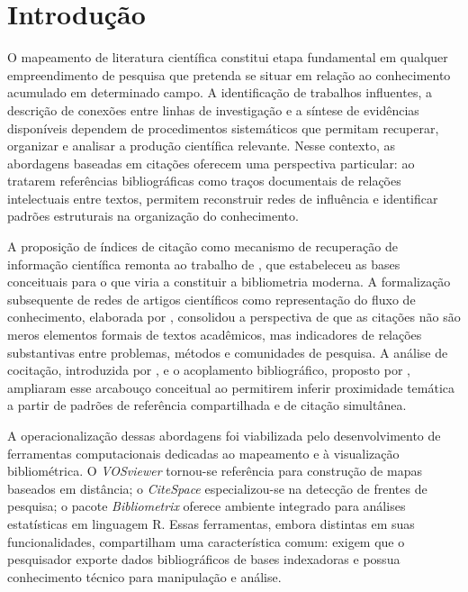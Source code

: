 \documentclass[portuguese]{textolivre}
\begin{document}
\begin{polyabstract}
\begin{english}
\begin{abstract}
\end{abstract}
\end{english}
\end{polyabstract}

\section{Introdução}\label{sec-intro}
O mapeamento de literatura científica constitui etapa fundamental em qualquer empreendimento de pesquisa que pretenda se situar em relação ao conhecimento acumulado em determinado campo. A identificação de trabalhos influentes, a descrição de conexões entre linhas de investigação e a síntese de evidências disponíveis dependem de procedimentos sistemáticos que permitam recuperar, organizar e analisar a produção científica relevante. Nesse contexto, as abordagens baseadas em citações oferecem uma perspectiva particular: ao tratarem referências bibliográficas como traços documentais de relações intelectuais entre textos, permitem reconstruir redes de influência e identificar padrões estruturais na organização do conhecimento.

	A proposição de índices de citação como mecanismo de recuperação de informação científica remonta ao trabalho de \textcite{Garfield1955}, que estabeleceu as bases conceituais para o que viria a constituir a bibliometria moderna. A formalização subsequente de redes de artigos científicos como representação do fluxo de conhecimento, elaborada por \textcite{Price1965}, consolidou a perspectiva de que as citações não são meros elementos formais de textos acadêmicos, mas indicadores de relações substantivas entre problemas, métodos e comunidades de pesquisa. A análise de cocitação, introduzida por \textcite{Small1973}, e o acoplamento bibliográfico, proposto por \textcite{Kessler1963}, ampliaram esse arcabouço conceitual ao permitirem inferir proximidade temática a partir de padrões de referência compartilhada e de citação simultânea.
    
	A operacionalização dessas abordagens foi viabilizada pelo desenvolvimento de ferramentas computacionais dedicadas ao mapeamento e à visualização bibliométrica. O \textit{VOSviewer} \cite{VanEck2010} tornou-se referência para construção de mapas baseados em distância; o \textit{CiteSpace} \cite{Chen2006} especializou-se na detecção de frentes de pesquisa; o pacote \textit{Bibliometrix} \cite{Aria2017} oferece ambiente integrado para análises estatísticas em linguagem R. Essas ferramentas, embora distintas em suas funcionalidades, compartilham uma característica comum: exigem que o pesquisador exporte dados bibliográficos de bases indexadoras e possua conhecimento técnico para manipulação e análise.
    
\end{document}
